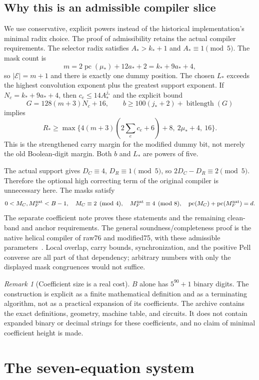 \documentclass[11pt]{article}
\newcommand{\pc}{\operatorname{pc}}
\theoremstyle{remark}\newtheorem{remark}[theorem]{Remark}
\begin{document}
\subsection{Why this is an admissible compiler slice}

We use conservative, explicit powers instead of the historical implementation's minimal radix choice. The proof of admissibility retains the actual compiler requirements. The selector radix satisfies $A_*>k_*+1$ and $A_*\equiv1\pmod5$. The mask count is
\[
 m=2\pc(\mu_*)+12a_*+2=k_*+9a_*+4,
\]
so $|\mathcal E|=m+1$ and there is exactly one dummy position. The chosen $L_*$ exceeds the highest convolution exponent plus the greatest support exponent. If $N_c=k_*+9a_*+4$, then $c_e\le14A_*^{j_*}$ and the explicit bound
\[
 G=128(m+3)N_c+16,
 \qquad b\ge100(j_*+2)+\operatorname{bitlength}(G)
\]
implies
\[
 R_*\ge \max\{4(m+3)(2\textstyle\sum_e c_e+6)+8,\ 2\mu_*+4,\ 16\}.
\]
This is the strengthened carry margin for the modified dummy bit, not merely the old Boolean-digit margin. Both $b$ and $L_*$ are powers of five.

The actual support gives $D_C\equiv4$, $D_R\equiv1\pmod5$, so $2D_C-D_R\equiv2\pmod5$. Therefore the optional high correcting term of the original compiler is unnecessary here. The masks satisfy
\[
0<M_C,M_F^{\rm nat}<B-1,\quad M_C\equiv2\pmod4,
\quad M_F^{\rm nat}\equiv4\pmod8,
\quad\pc(M_C)+\pc(M_F^{\rm nat})=d.
\]
The separate coefficient note proves these statements and the remaining clean-band and anchor requirements. The general soundness/completeness proof is the native helical compiler of raw76 and modified75, with these admissible parameters~\cite{Raw76,Raw75,HalfCompiler}. Local overlap, carry bounds, synchronization, and the positive Pell converse are all part of that dependency; arbitrary numbers with only the displayed mask congruences would not suffice.

\begin{remark}[Coefficient size is a real cost]
$B$ alone has $5^{90}+1$ binary digits. The construction is explicit as a finite mathematical definition and as a terminating algorithm, not as a practical expansion of its coefficients. The archive contains the exact definitions, geometry, machine table, and circuits. It does not contain expanded binary or decimal strings for these coefficients, and no claim of minimal coefficient height is made.
\end{remark}

\section{The seven-equation system}\label{sec:system}
\end{document}
